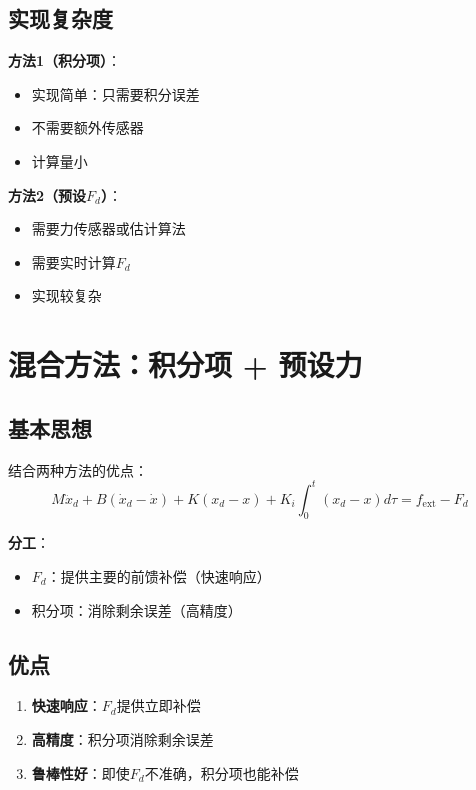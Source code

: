 \documentclass[12pt,a4paper]{article}
\begin{document}
\subsection{实现复杂度}

\textbf{方法1（积分项）}：
\begin{itemize}
\item 实现简单：只需要积分误差
\item 不需要额外传感器
\item 计算量小
\end{itemize}

\textbf{方法2（预设$F_d$）}：
\begin{itemize}
\item 需要力传感器或估计算法
\item 需要实时计算$F_d$
\item 实现较复杂
\end{itemize}

\section{混合方法：积分项 + 预设力}

\subsection{基本思想}

结合两种方法的优点：
\begin{equation}
M\ddot{x}_d + B(\dot{x}_d - \dot{x}) + K(x_d - x) + K_i \int_0^t (x_d - x) d\tau = f_{\text{ext}} - F_d \tag{混合}
\end{equation}

\textbf{分工}：
\begin{itemize}
\item $F_d$：提供主要的前馈补偿（快速响应）
\item 积分项：消除剩余误差（高精度）
\end{itemize}

\subsection{优点}

\begin{enumerate}
\item \textbf{快速响应}：$F_d$提供立即补偿
\item \textbf{高精度}：积分项消除剩余误差
\item \textbf{鲁棒性好}：即使$F_d$不准确，积分项也能补偿
\end{enumerate}
\end{document}
